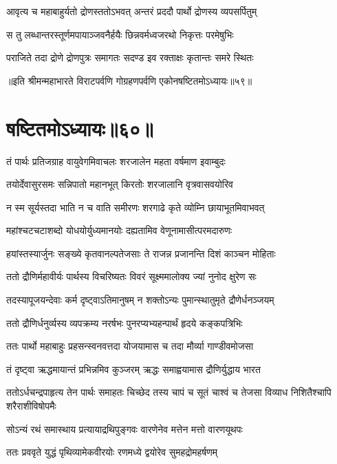 \twolineshloka
{आवृत्य च महाबाहुर्यतो द्रोणस्ततोऽभवत्}
{अन्तरं प्रददौ पार्थो द्रोणस्य व्यपसर्पितुम्}


\twolineshloka
{स तु लब्धान्तरस्तूर्णमपायाञ्जवनैर्हयैः}
{छिन्नवर्मध्वजरथो निकृत्तः परमेषुभिः}


\twolineshloka
{पराजिते तदा द्रोणे द्रोणपुत्रः समागतः}
{सदण्ड इव रक्ताक्षः कृतान्तः समरे स्थितः}

॥इति श्रीमन्महाभारते विराटपर्वणि गोग्रहणपर्वणि एकोनषष्टितमोऽध्यायः॥५९॥

\chapter{षष्टितमोऽध्यायः॥६०॥}

\twolineshloka
{तं पार्थः प्रतिजग्राह वायुवेगमिवाचलः}
{शरजालेन महता वर्षमाण इवाम्बुदः}


\twolineshloka
{तयोर्देवासुरसमः सन्निपातो महानभूत्}
{किरतोः शरजालानि वृत्रवासवयोरिव}


\twolineshloka
{न स्म सूर्यस्तदा भाति न च वाति समीरणः}
{शरगाढे कृते व्योम्नि छायाभूतमिवाभवत्}


\twolineshloka
{महांश्चटचटाशब्दो योधयोर्युध्यमानयोः}
{दह्यतामिव वेणूनामासीत्परमदारुणः}


\twolineshloka
{हयांस्तस्यार्जुनः सङ्ख्ये कृतवानल्पतेजसाः}
{ते राजन्न प्रजानन्ति दिशं काञ्चन मोहिताः}


\twolineshloka
{ततो द्रौणिर्महावीर्यः पार्थस्य विचरिष्यतः}
{विवरं सूक्ष्ममालोक्य ज्यां नुनोद क्षुरेण सः}


\twolineshloka
{तदस्यापूजयन्देवाः कर्म दृष्ट्वाऽतिमानुषम्}
{न शक्तोऽन्यः पुमान्स्थातुमृते द्रौणेर्धनञ्जयम्}


\twolineshloka
{ततो द्रौणिर्धनुर्व्यस्य व्यपक्रम्य नरर्षभः}
{पुनरप्यभ्यहन्पार्थं हृदये कङ्कपत्रिभिः}



\twolineshloka
{ततः पार्थो महाबाहुः प्रहसन्स्वनवत्तदा}
{योजयामास च तदा मौर्व्या गाण्डीवमोजसा}


\twolineshloka
{तं दृष्ट्वा ऋद्धमायान्तं प्रभिन्नमिव कुञ्जरम्}
{ऋद्धः समाह्वयामास द्रौणिर्युद्धाय भारत}


\threelineshloka
{ततोऽर्धचन्द्रपाहृत्य तेन पार्थः समाहतः}
{चिच्छेद तस्य चापं च सूतं चाश्वं च तेजसा}
{विव्याध निशितैश्चापि शरैराशीविषोपमैः}


\twolineshloka
{सोऽन्यं रथं समास्थाय प्रत्यायाद्रथिपुङ्गवः}
{वारणेनेव मत्तेन मत्तो वारणयूथपः}


\twolineshloka
{ततः प्रववृते युद्धं पृथिव्यामेकवीरयोः}
{रणमध्ये द्वयोरेव सुमहद्रोमहर्षणम्}


